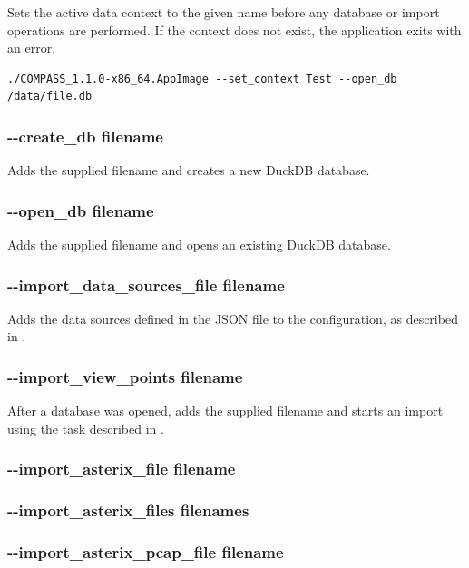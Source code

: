 Sets the active data context to the given name before any database or import operations are performed. If the context does not exist, the application exits with an error.

\begin{lstlisting}
./COMPASS_1.1.0-x86_64.AppImage --set_context Test --open_db /data/file.db
\end{lstlisting}

\subsubsection{-{}-create\_db filename}

Adds the supplied filename and creates a new DuckDB database.
 
\subsubsection{-{}-open\_db filename}

Adds the supplied filename and opens an existing DuckDB database.

\subsubsection{-{}-import\_data\_sources\_file filename}

Adds the data sources defined in the JSON file to the configuration, as described in .

\subsubsection{-{}-import\_view\_points filename}

After a database was opened, adds the supplied filename and starts an import using the task described in .
 
\subsubsection{-{}-import\_asterix\_file filename}
\subsubsection{-{}-import\_asterix\_files filenames}
\subsubsection{-{}-import\_asterix\_pcap\_file filename}
